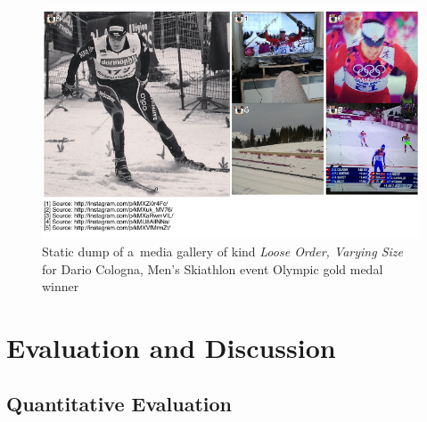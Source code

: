 \documentclass{sig-alternate-somus}
\begin{document}
\begin{figure}[t!]
  \centering
  \includegraphics[width=0.75\columnwidth]{figures/dario_cologna/mediagallery_looseOrder_1391945454845.png}
  \caption{Static dump of a~media gallery of kind \emph{Loose Order, Varying Size}
  for Dario Cologna, Men's Skiathlon event Olympic gold medal winner}
  \label{fig:dario-cologna}    
\end{figure}


\section{Evaluation and Discussion}
\label{sec:evaluation-and-discussion}
\selectfont

\subsection{Quantitative Evaluation}
\end{document}
